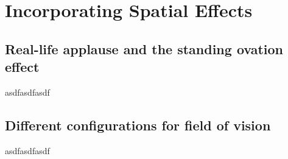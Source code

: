 \chapter{Incorporating Spatial Effects}
\label{chap4}
\def\statepsi{\mid \psi \; \rangle}
\def\energy{\mid E_{\vec{k}} \; \rangle}
\def\psixt{\mid \psi(x,t) \; \rangle}
\def\statepsixtrev{\mid \psi(x,t=T_{rev}) \; \rangle}
\def\statepsixt0{\mid \psi(x,t=0) \; \rangle}
\def\lowering{S^-_l \mid 0 \; \rangle}
\def\loweringa{S^-_m \; S^-_l \mid 0 \; \rangle}



\section{Real-life applause and the standing ovation effect}

\hspace{\parindent} asdfasdfasdf

\section{Different configurations for field of vision}

\hspace{\parindent} asdfasdfasdf




